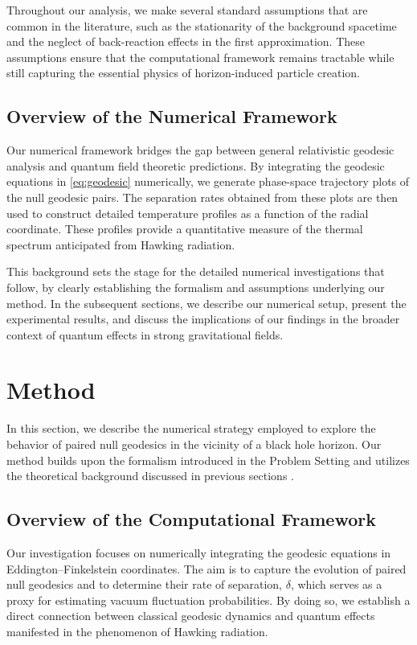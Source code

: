 \documentclass{article}\usepackage[utf8]{inputenc} %
\begin{document}
Throughout our analysis, we make several standard assumptions that are common in the literature, such as the stationarity of the background spacetime and the neglect of back-reaction effects in the first approximation. These assumptions ensure that the computational framework remains tractable while still capturing the essential physics of horizon-induced particle creation.

\subsection{Overview of the Numerical Framework}
Our numerical framework bridges the gap between general relativistic geodesic analysis and quantum field theoretic predictions. By integrating the geodesic equations in \ref{eq:geodesic} numerically, we generate phase-space trajectory plots of the null geodesic pairs. The separation rates obtained from these plots are then used to construct detailed temperature profiles as a function of the radial coordinate. These profiles provide a quantitative measure of the thermal spectrum anticipated from Hawking radiation.

This background sets the stage for the detailed numerical investigations that follow, by clearly establishing the formalism and assumptions underlying our method. In the subsequent sections, we describe our numerical setup, present the experimental results, and discuss the implications of our findings in the broader context of quantum effects in strong gravitational fields.

\section{Method}
In this section, we describe the numerical strategy employed to explore the behavior of paired null geodesics in the vicinity of a black hole horizon. Our method builds upon the formalism introduced in the Problem Setting and utilizes the theoretical background discussed in previous sections \cite{Hawking1975,Jacobson1993,Unruh1976}. 

\subsection{Overview of the Computational Framework}
Our investigation focuses on numerically integrating the geodesic equations in Eddington–Finkelstein coordinates. The aim is to capture the evolution of paired null geodesics and to determine their rate of separation, $\delta$, which serves as a proxy for estimating vacuum fluctuation probabilities. By doing so, we establish a direct connection between classical geodesic dynamics and quantum effects manifested in the phenomenon of Hawking radiation.
\end{document}
